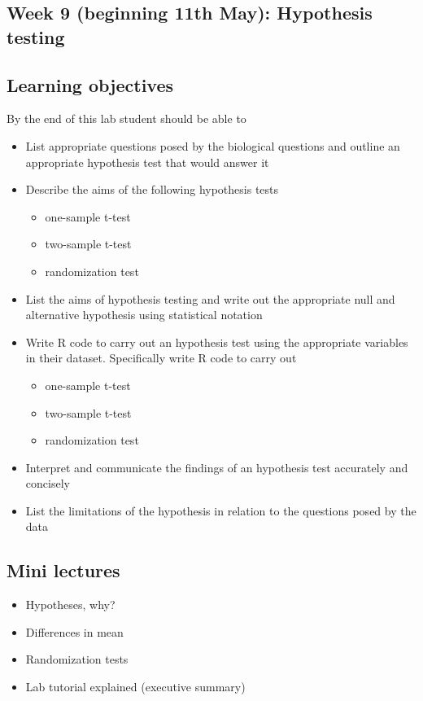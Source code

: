 \documentclass{article}
\begin{document}
\newpage

\subsection*{Week 9 (beginning 11th May): Hypothesis testing}


\subsection*{Learning objectives}
By the end of this lab student should be able to
\begin{itemize}
\item List appropriate questions posed by the biological questions and  outline an appropriate hypothesis test that would answer it
\item Describe the aims of the following hypothesis tests
  \begin{itemize}
  \item one-sample t-test
  \item two-sample t-test
  \item randomization test
  \end{itemize}
\item List the aims of hypothesis testing and write out the appropriate null and alternative hypothesis using statistical notation
\item Write R code to carry out an hypothesis test using the appropriate variables in their dataset. Specifically write R code to carry out
  \begin{itemize}
  \item one-sample t-test
  \item two-sample t-test
  \item randomization test
  \end{itemize}
\item Interpret and communicate the findings of an hypothesis test accurately and concisely
\item List the limitations of the hypothesis in relation to the questions posed by the data
\end{itemize}

\subsection*{Mini lectures}

\begin{itemize}
\item Hypotheses, why?
\item Differences in mean
\item Randomization tests
\item Lab tutorial explained (executive summary)
\end{itemize}
\end{document}
